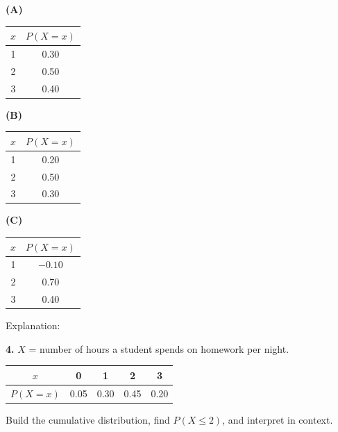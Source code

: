 \documentclass[10pt]{article}
\begin{document}
\begin{practicebox}
\vspace{6pt}
\begin{minipage}[t]{0.3\linewidth}
\textbf{(A)}
\begin{tabular}{@{}cc@{}}
$x$ & $P(X=x)$ \\
\hline
1 & 0.30 \\
2 & 0.50 \\
3 & 0.40 \\
\end{tabular}
\end{minipage}
\hfill
\begin{minipage}[t]{0.3\linewidth}
\textbf{(B)}
\begin{tabular}{@{}cc@{}}
$x$ & $P(X=x)$ \\
\hline
1 & 0.20 \\
2 & 0.50 \\
3 & 0.30 \\
\end{tabular}
\end{minipage}
\hfill
\begin{minipage}[t]{0.3\linewidth}
\textbf{(C)}
\begin{tabular}{@{}cc@{}}
$x$ & $P(X=x)$ \\
\hline
1 & $-0.10$ \\
2 & 0.70 \\
3 & 0.40 \\
\end{tabular}
\end{minipage}

\vspace{8pt}
Explanation:\\

\tcbbreak
\vspace{0.14in}

\textbf{4.} $X$ = number of hours a student spends on homework per night.
\begin{center}
\renewcommand{\arraystretch}{1.4}
\begin{tabular}{@{}ccccc@{}}
$x$ & 0 & 1 & 2 & 3 \\
\hline
$P(X=x)$ & 0.05 & 0.30 & 0.45 & 0.20 \\
\end{tabular}
\end{center}
Build the cumulative distribution, find $P(X \le 2)$, and interpret in context.


\end{practicebox}
\end{document}
